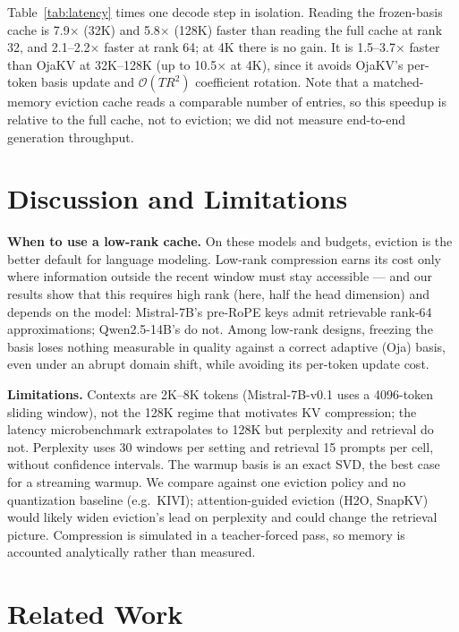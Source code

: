 \documentclass{article}
\begin{document}
Table~\ref{tab:latency} times one decode step in isolation. Reading the
frozen-basis cache is 7.9$\times$ (32K) and 5.8$\times$ (128K) faster than
reading the full cache at rank 32, and 2.1--2.2$\times$ faster at rank 64; at 4K
there is no gain. It is 1.5--3.7$\times$ faster than OjaKV at 32K--128K (up to
10.5$\times$ at 4K), since it avoids OjaKV's per-token basis update and
$\mathcal{O}(TR^2)$ coefficient rotation. Note that a matched-memory eviction cache reads a comparable number of
entries, so this speedup is relative to the full cache, not to eviction; we
did not measure end-to-end generation throughput.

\section{Discussion and Limitations}
\label{sec:discussion}

\textbf{When to use a low-rank cache.} On these models and budgets, eviction
is the better default for language modeling. Low-rank compression earns its
cost only where information outside the recent window must stay accessible
--- and our results show that this requires high rank (here, half the head
dimension) and depends on the model: Mistral-7B's pre-RoPE keys admit
retrievable rank-64 approximations; Qwen2.5-14B's do not. Among low-rank
designs, freezing the basis loses nothing measurable in quality against a
correct adaptive (Oja) basis, even under an abrupt domain shift, while
avoiding its per-token update cost.

\textbf{Limitations.} Contexts are 2K--8K tokens (Mistral-7B-v0.1 uses a
4096-token sliding window), not the 128K regime that motivates KV
compression; the latency microbenchmark extrapolates to 128K but perplexity
and retrieval do not. Perplexity uses 30 windows per setting and retrieval 15
prompts per cell, without confidence intervals. The warmup basis is an exact
SVD, the best case for a streaming warmup. We compare against one eviction
policy and no quantization baseline (e.g.\ KIVI); attention-guided eviction
(H2O, SnapKV) would likely widen eviction's lead on perplexity and could
change the retrieval picture. Compression is simulated in a teacher-forced
pass, so memory is accounted analytically rather than measured.

\section{Related Work}
\label{sec:related}
\end{document}
